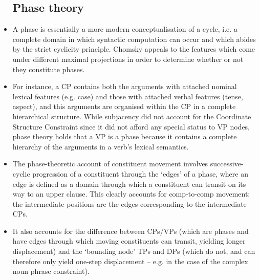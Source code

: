 \documentclass{article}
\begin{document}
\begin{itemize}
    \subsection{Phase theory}
    \item A phase is essentially a more modern conceptualisation of a cycle, i.e. a complete domain in which syntactic computation can occur and which abides by the strict cyclicity principle. Chomsky appeals to the features which come under different maximal projections in order to determine whether or not they constitute phases. 
    \item For instance, a CP contains both the arguments with attached nominal lexical features (e.g. case) and those with attached verbal features (tense, aspect), and this arguments are organised within the CP in a complete hierarchical structure. While subjacency did not account for the Coordinate Structure Constraint since it did not afford any special status to VP nodes, phase theory holds that a VP is a phase because it contains a complete hierarchy of the arguments in a verb’s lexical semantics. 
    \item The phase-theoretic account of  constituent movement involves successive-cyclic progression of a constituent through the ‘edges’ of a phase, where an edge is defined as a domain through which a constituent can transit on its way to an upper clause. This clearly accounts for comp-to-comp movement: the intermediate positions are the edges corresponding to the intermediate CPs. 
    \item It also accounts for the difference between CPs/VPs (which are phases and have edges through which moving constituents can transit, yielding longer displacement) and the `bounding node' TPs and DPs (which do not, and can therefore only yield one-step displacement – e.g. in the case of the complex noun phrase constraint). 

\end{itemize}
\end{document}

